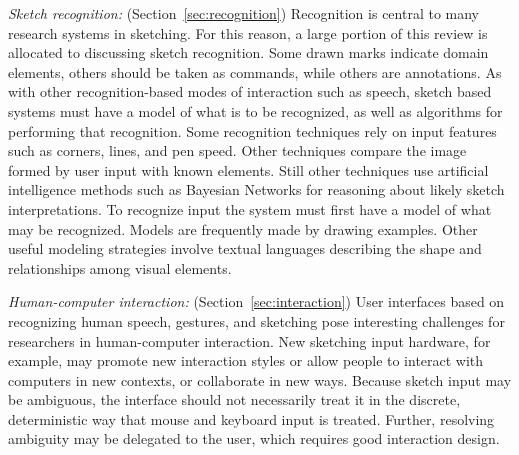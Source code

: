 \textit{Sketch recognition:} (Section~\ref{sec:recognition})
Recognition is central to many research systems in sketching. For this
reason, a large portion of this review is allocated to discussing
sketch recognition. Some drawn marks indicate domain elements, others
should be taken as commands, while others are annotations. As with
other recognition-based modes of interaction such as speech, sketch
based systems must have a model of what is to be recognized, as well
as algorithms for performing that recognition. Some recognition
techniques rely on input features such as corners, lines, and pen
speed. Other techniques compare the image formed by user input with
known elements. Still other techniques use artificial intelligence
methods such as Bayesian Networks for reasoning about likely sketch
interpretations. To recognize input the system must first have a model
of what may be recognized. Models are frequently made by drawing
examples. Other useful modeling strategies involve textual languages
describing the shape and relationships among visual elements.

\textit{Human-computer interaction:} (Section~\ref{sec:interaction})
User interfaces based on recognizing human speech, gestures, and
sketching pose interesting challenges for researchers in
human-computer interaction. New sketching input hardware, for example,
may promote new interaction styles or allow people to interact with
computers in new contexts, or collaborate in new ways. Because sketch
input may be ambiguous, the interface should not necessarily treat it
in the discrete, deterministic way that mouse and keyboard input is
treated. Further, resolving ambiguity may be delegated to the user,
which requires good interaction design.
